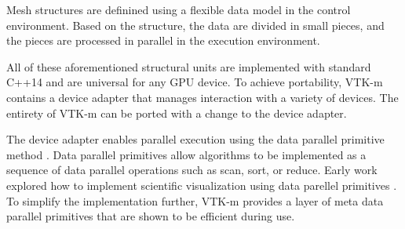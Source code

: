 Mesh structures are definined using a flexible data model \cite{Meredith2012} in the control environment.
Based on the structure, the data are divided in small pieces, and the pieces are processed in parallel in the execution environment.

All of these aforementioned structural units are implemented with standard C++14 and are universal for any GPU device.
To achieve portability, VTK-m contains a device adapter that manages interaction with a variety of devices.
The entirety of VTK-m can be ported with a change to the device adapter.

The device adapter enables parallel execution using the data parallel primitive method \cite{Blelloch1990}.
Data parallel primitives allow algorithms to be implemented as a sequence of data parallel operations such as scan, sort, or reduce.
Early work explored how to implement scientific visualization using data parellel primitives \cite{Lo2012}.
To simplify the implementation further, VTK-m provides a layer of meta data parallel primitives \cite{Moreland2021} that are shown to be efficient during use.
